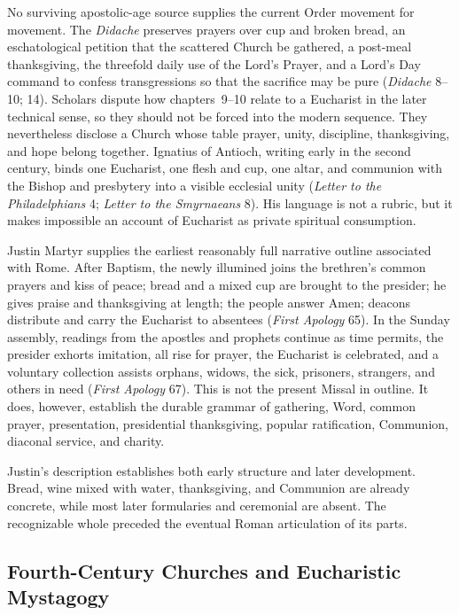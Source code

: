 No surviving apostolic-age source supplies the current Order movement for movement. The \emph{Didache} preserves prayers over cup and broken bread, an eschatological petition that the scattered Church be gathered, a post-meal thanksgiving, the threefold daily use of the Lord's Prayer, and a Lord's Day command to confess transgressions so that the sacrifice may be pure (\emph{Didache} 8--10; 14). Scholars dispute how chapters~9--10 relate to a Eucharist in the later technical sense, so they should not be forced into the modern sequence. They nevertheless disclose a Church whose table prayer, unity, discipline, thanksgiving, and hope belong together. Ignatius of Antioch, writing early in the second century, binds one Eucharist, one flesh and cup, one altar, and communion with the Bishop and presbytery into a visible ecclesial unity (\emph{Letter to the Philadelphians} 4; \emph{Letter to the Smyrnaeans} 8). His language is not a rubric, but it makes impossible an account of Eucharist as private spiritual consumption.

Justin Martyr supplies the earliest reasonably full narrative outline associated with Rome. After Baptism, the newly illumined joins the brethren's common prayers and kiss of peace; bread and a mixed cup are brought to the presider; he gives praise and thanksgiving at length; the people answer Amen; deacons distribute and carry the Eucharist to absentees (\emph{First Apology} 65). In the Sunday assembly, readings from the apostles and prophets continue as time permits, the presider exhorts imitation, all rise for prayer, the Eucharist is celebrated, and a voluntary collection assists orphans, widows, the sick, prisoners, strangers, and others in need (\emph{First Apology} 67). This is not the present Missal in outline. It does, however, establish the durable grammar of gathering, Word, common prayer, presentation, presidential thanksgiving, popular ratification, Communion, diaconal service, and charity.

Justin's description establishes both early structure and later development. Bread, wine mixed with water, thanksgiving, and Communion are already concrete, while most later formularies and ceremonial are absent. The recognizable whole preceded the eventual Roman articulation of its parts.

\subsection{Fourth-Century Churches and Eucharistic Mystagogy}

